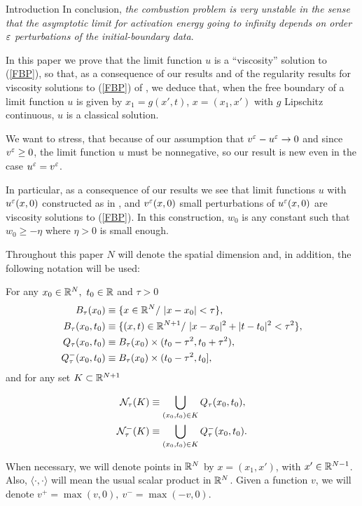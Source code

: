 \begin{section}{Introduction}
In conclusion, {\it the combustion problem is very unstable in the sense that
the asymptotic limit
for activation energy going to infinity depends on order $\varepsilon$ perturbations
of the initial-boundary data}.

In this paper we prove that the limit function $u$ is a ``viscosity''
solution to (\ref{FBP}), so that, as a consequence of our results and of
the regularity results for viscosity solutions to (\ref{FBP}) of \cite{F},
we deduce that, when the free boundary of a limit function $u$ is given by $x_1 = g(x',t)$, 
$x=(x_1,x')$ with $g$ Lipschitz continuous, $u$ is a classical solution. 



We want to stress, that because of our
assumption that $v^\varepsilon-u^\varepsilon\to0$ and since $v^\varepsilon\ge0$, the limit function $u$ must be nonnegative, so our
result is new even in the case $u^\varepsilon=v^\varepsilon$.

In particular, as a consequence
of our results we see that limit functions $u$ with $u^\varepsilon(x,0)$
 constructed as in \cite{CV}, and $v^\varepsilon(x,0)$ small perturbations of $u^\varepsilon
(x,0)$
 are viscosity solutions to (\ref{FBP}). In this construction, $w_0$ is any
constant such that $w_0\ge -\eta$ where $\eta>0$ is small enough.

 \bigskip



Throughout this paper $N$ will denote the spatial dimension and, in addition, 
the following notation will be used:

For any $x_0\in{\Bbb R}^N,\ t_0\in{\Bbb R}$ and $\tau>0$
\begin{align*}
B_{\tau}(x_0) &\equiv \{ x\in \R^N/\ |x-x_0|<\tau \},\\
B_{\tau}(x_0,t_0) &\equiv \{ (x,t)\in \R^{N+1}/\ |x-x_0|^2+|t-t_0|^2<\tau^2 \},\\
Q_{\tau}(x_0,t_0) &\equiv B_{\tau}(x_0)\times (t_0-\tau^2,t_0+\tau^2),\\
Q^-_{\tau}(x_0,t_0) &\equiv B_{\tau}(x_0)\times (t_0-\tau^2,t_0],
\end{align*}
and for any set $K\subset {\Bbb R}^{N+1}$

\begin{align*}
{\cal N}_{\tau}(K) &\equiv \bigcup_{(x_0,t_0)\in K} Q_{\tau}(x_0,t_0),\\
{\cal N}^-_{\tau}(K) &\equiv \bigcup_{(x_0,t_0)\in K} Q^-_{\tau}(x_0,t_0).
\end{align*}

When necessary, we will denote points in ${\Bbb R}^N$ by $x=(x_1,x')$, with 
$x'\in{\Bbb R}^{N-1}$. Also, $\langle \cdot,\cdot \rangle$ will mean the usual 
scalar product in ${\Bbb R}^{N}$. Given a function $v$, we will denote 
$v^+ = \max(v,0),\ v^-=\max(-v,0)$.


\end{section}
